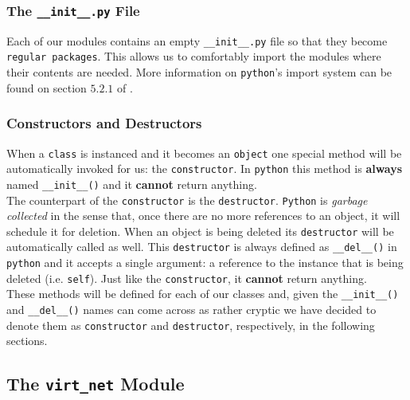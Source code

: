             \subsubsection{The \texttt{\_\_init\_\_.py} File}
                Each of our modules contains an empty \texttt{\_\_init\_\_.py} file so that they become \texttt{regular packages}. This allows us to comfortably import the modules where their contents are needed. More information on \texttt{python}'s import system can be found on section $5.2.1$ of \cite{bib:python-import}.

            \subsubsection{Constructors and Destructors}
                When a \texttt{class} is instanced and it becomes an \texttt{object} one special method will be automatically invoked for us: the \texttt{constructor}. In \texttt{python} this method is \textbf{always} named \texttt{\_\_init\_\_()} and it \textbf{cannot} return anything.\\

                The counterpart of the \texttt{constructor} is the \texttt{destructor}. \texttt{Python} is \textit{garbage collected} in the sense that, once there are no more references to an object, it will schedule it for deletion. When an object is being deleted its \texttt{destructor} will be automatically called as well. This \texttt{destructor} is always defined as \texttt{\_\_del\_\_()} in \texttt{python} and it accepts a single argument: a reference to the instance that is being deleted (i.e. \texttt{self}). Just like the \texttt{constructor}, it \textbf{cannot} return anything.\\

                These methods will be defined for each of our classes and, given the \texttt{\_\_init\_\_()} and \texttt{\_\_del\_\_()} names can come across as rather cryptic we have decided to denote them as \texttt{constructor} and \texttt{destructor}, respectively, in the following sections.\\

        \subsection{The \texttt{virt\_net} Module}
            
            
            
            
            
            
            
            

